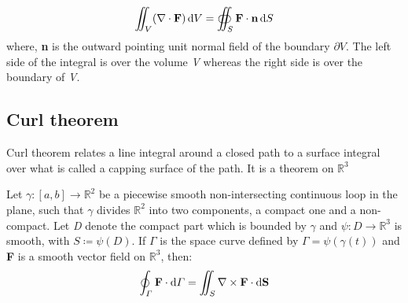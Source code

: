 \begin{equation}
	\iint_{V} (\nabla \cdot \textbf{F}) \mathop{}\!\mathrm{d} V = \oiint_{S} \textbf{F} \cdot \textbf{n} \mathop{}\!\mathrm{d} S
\end{equation}
where, \textbf{n} is the outward pointing unit normal field of the boundary $\partial V$. The left side of the integral is over the volume \textit{V} whereas the right side is over the boundary of \textit{V}.

\subsection{Curl theorem}
Curl theorem relates a line integral around a closed path to a surface integral over what is called a capping surface of the path. It is a theorem on $ \mathbb{R}^{3} $

Let $ \gamma:[a,b] \rightarrow \mathbb{R}^{2} $ be a piecewise smooth non-intersecting continuous loop in the plane, such that $\gamma$ divides $\mathbb{R}^{2}$ into two components, a compact one and a non-compact. Let \textit{D} denote the compact part which is bounded by $ \gamma$ and $ \psi: D \rightarrow \mathbb{R}^{3} $ is smooth, with $ S \coloneqq \psi (D)$. If $\varGamma$ is the space curve defined by $ \varGamma = \psi (\gamma (t))$ and \textbf{F} is a smooth vector field on $ \mathbb{R}^{3}$, then:
\begin{equation}
	\oint_{\varGamma} \textbf{F} \cdot \mathop{}\!\mathrm{d} \varGamma = \iint_{S} \nabla \times \textbf{F} \cdot \mathop{}\!\mathrm{d} \textbf{S}
\end{equation}

